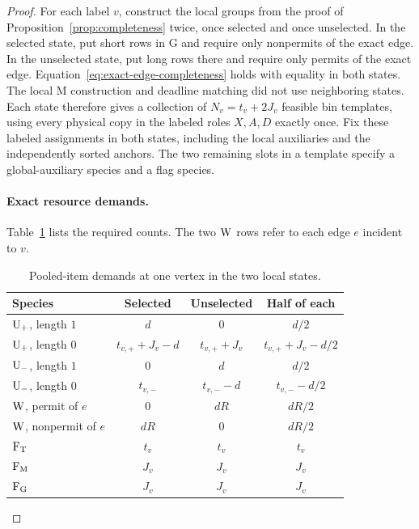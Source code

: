 \begin{proof}
For each label $v$, construct the local groups from the proof of
Proposition~\ref{prop:completeness} twice, once selected and once
unselected.  In the selected state, put short rows in $\mathrm G$
and require only nonpermits of the exact edge.  In the unselected
state, put long rows there and require only permits of the exact
edge.  Equation~\eqref{eq:exact-edge-completeness} holds with
equality in both states.
The local $\mathrm M$ construction and deadline matching did not
use neighboring states.  Each state therefore gives a collection
of $N_v=t_v+2J_v$ feasible bin templates, using every physical
copy in the labeled roles $X,A,D$ exactly once.
Fix these labeled assignments in both states, including the local
auxiliaries and the independently sorted anchors.  The two remaining
slots in a template specify a global-auxiliary species and a flag
species.

\paragraph{Exact resource demands.}
Table~\ref{tab:local-state-demands} lists the required counts.
The two $\mathrm{W}$ rows refer to each edge $e$ incident to $v$.
\begin{table}[htbp]
\centering
\caption{Pooled-item demands at one vertex in the two local states.}
\label{tab:local-state-demands}
\vspace{6pt}
\begin{tabular}{@{}lccc@{}}
\toprule
Species & Selected & Unselected & Half of each\\
\midrule
$\mathrm{U}_{+}$, length $1$ & $d$ & $0$ & $d/2$\\
$\mathrm{U}_{+}$, length $0$ & $t_{v,+}+J_v-d$ & $t_{v,+}+J_v$
 & $t_{v,+}+J_v-d/2$\\
$\mathrm{U}_{-}$, length $1$ & $0$ & $d$ & $d/2$\\
$\mathrm{U}_{-}$, length $0$ & $t_{v,-}$ & $t_{v,-}-d$ & $t_{v,-}-d/2$\\
$\mathrm{W}$, permit of $e$ & $0$ & $dR$ & $dR/2$\\
$\mathrm{W}$, nonpermit of $e$ & $dR$ & $0$ & $dR/2$\\
$\mathrm{F}_{\mathrm T}$ & $t_v$ & $t_v$ & $t_v$\\
$\mathrm{F}_{\mathrm M}$ & $J_v$ & $J_v$ & $J_v$\\
$\mathrm{F}_{\mathrm G}$ & $J_v$ & $J_v$ & $J_v$\\
\bottomrule
\end{tabular}
\end{table}


\end{proof}
